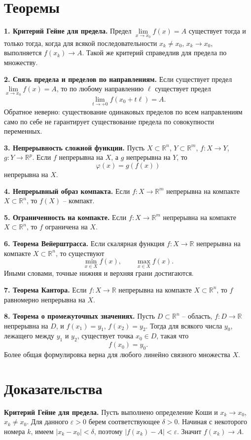 \documentclass[12pt,a4paper]{article}
\newcommand{\R}{\mathbb{R}}
\newcommand{\eps}{\varepsilon}
\begin{document}
\section*{Теоремы}

\textbf{1. Критерий Гейне для предела.}
Предел \(\lim\limits_{x\to x_0}f(x)=A\) существует тогда и только тогда, когда
для всякой последовательности \(x_k\ne x_0\), \(x_k\to x_0\), выполняется
\(f(x_k)\to A\). Такой же критерий справедлив для предела по множеству.

\textbf{2. Связь предела и пределов по направлениям.}
Если существует предел \(\lim\limits_{x\to x_0}f(x)=A\), то по любому
направлению \(\ell\) существует предел
\[
  \lim_{t\to+0}f(x_0+t\ell)=A.
\]
Обратное неверно: существование одинаковых пределов по всем направлениям само
по себе не гарантирует существование предела по совокупности переменных.

\textbf{3. Непрерывность сложной функции.}
Пусть \(X\subset\R^n\), \(Y\subset\R^m\), \(f:X\to Y\), \(g:Y\to\R^p\).
Если \(f\) непрерывна на \(X\), а \(g\) непрерывна на \(Y\), то
\[
  \varphi(x)=g(f(x))
\]
непрерывна на \(X\).

\textbf{4. Непрерывный образ компакта.}
Если \(f:X\to\R^m\) непрерывна на компакте \(X\subset\R^n\), то \(f(X)\) --
компакт.

\textbf{5. Ограниченность на компакте.}
Если \(f:X\to\R^m\) непрерывна на компакте \(X\subset\R^n\), то \(f\)
ограничена на \(X\).

\textbf{6. Теорема Вейерштрасса.}
Если скалярная функция \(f:X\to\R\) непрерывна на компакте \(X\subset\R^n\), то
существуют
\[
  \min_{x\in X}f(x), \qquad \max_{x\in X}f(x).
\]
Иными словами, точные нижняя и верхняя грани достигаются.

\textbf{7. Теорема Кантора.}
Если \(f:X\to\R\) непрерывна на компакте \(X\subset\R^n\), то \(f\) равномерно
непрерывна на \(X\).

\textbf{8. Теорема о промежуточных значениях.}
Пусть \(D\subset\R^n\) -- область, \(f:D\to\R\) непрерывна на \(D\), и
\(f(x_1)=y_1\), \(f(x_2)=y_2\). Тогда для всякого числа \(y_0\), лежащего между
\(y_1\) и \(y_2\), существует точка \(x_0\in D\), такая что
\[
  f(x_0)=y_0.
\]
Более общая формулировка верна для любого линейно связного множества \(X\).

\section*{Доказательства}

\textbf{Критерий Гейне для предела.}
Пусть выполнено определение Коши и \(x_k\to x_0\), \(x_k\ne x_0\). Для данного
\(\eps>0\) берем соответствующее \(\delta>0\). Начиная с некоторого номера
\(k\), имеем \(|x_k-x_0|<\delta\), поэтому \(|f(x_k)-A|<\eps\). Значит
\(f(x_k)\to A\).
\end{document}
